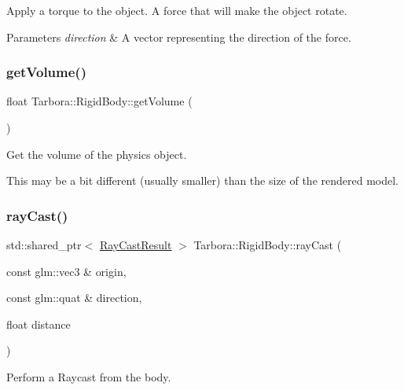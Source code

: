 Apply a torque to the object. A force that will make the object rotate. 


\begin{DoxyParams}{Parameters}
{\em direction} & A vector representing the direction of the force. \\
\hline
\end{DoxyParams}
\mbox{\label{classTarbora_1_1RigidBody_ae989466abcaf66c6b4dab5e865619a15}} 
\subsubsection{\texorpdfstring{get\+Volume()}{getVolume()}}
{\footnotesize\ttfamily float Tarbora\+::\+Rigid\+Body\+::get\+Volume (\begin{DoxyParamCaption}{ }\end{DoxyParamCaption})\hspace{0.3cm}{\ttfamily [inline]}}



Get the volume of the physics object. 

This may be a bit different (usually smaller) than the size of the rendered model. \mbox{\label{classTarbora_1_1RigidBody_ab0ea04e6929334288ba061767c9ad141}} 
\subsubsection{\texorpdfstring{ray\+Cast()}{rayCast()}}
{\footnotesize\ttfamily std\+::shared\+\_\+ptr$<$ \hyperlink{structTarbora_1_1RayCastResult}{Ray\+Cast\+Result} $>$ Tarbora\+::\+Rigid\+Body\+::ray\+Cast (\begin{DoxyParamCaption}\item[{const glm\+::vec3 \&}]{origin,  }\item[{const glm\+::quat \&}]{direction,  }\item[{float}]{distance }\end{DoxyParamCaption})}



Perform a Raycast from the body. 


